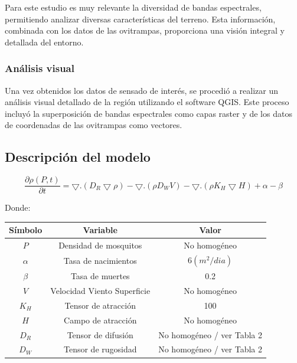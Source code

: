 Para este estudio es muy relevante la diversidad de bandas espectrales, permitiendo analizar diversas características del terreno. Esta información, combinada con los datos de las ovitrampas, proporciona una visión integral y detallada del entorno.


\subsubsection{Análisis visual}

Una vez obtenidos los datos de sensado de interés, se procedió a realizar un análisis visual detallado de la región utilizando el software QGIS. Este proceso incluyó la superposición de bandas espectrales como capas raster y de los datos de coordenadas de las ovitrampas como vectores.

\subsection{Descripción del modelo}

$$\frac{\partial \rho(P,t)}{\partial t}=\bigtriangledown .(D_R \bigtriangledown \rho)-\bigtriangledown.(\rho D_W V)- \bigtriangledown . (\rho K_H \bigtriangledown H) + \alpha - \beta$$

Donde:

\begin{center}
	\begin{tabular}{|c | c | c|} 
		\hline
		\textbf{Símbolo} & \textbf{Variable} & \textbf{Valor}\\
		\hline
		$$P$$ & Densidad de mosquitos & No homogéneo \\
		\hline
		$\alpha$  & Tasa de nacimientos & $6 (m^2/dia)$ \\
		\hline
		$\beta$  & Tasa de muertes             & 0.2 \\
		\hline
		$V$   & Velocidad Viento Superficie & No homogéneo \\
		\hline
		$K_H$   & Tensor de atracción         & 100 \\
		\hline
		$H$    & Campo de atracción          & No homogéneo \\
		\hline
		$D_R$   & Tensor de difusión          & No homogéneo / ver Tabla 2 \\
		\hline
		$D_W$   & Tensor de rugosidad         & No homogéneo / ver Tabla 2\\
		\hline
	\end{tabular}
\end{center}


